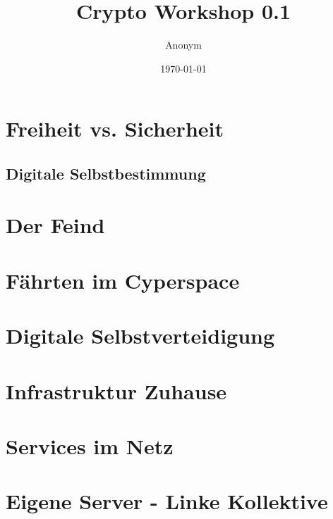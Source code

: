 \documentclass[utf8x]{beamer}
\begin{document}
\title{Crypto Workshop 0.1}   
\author{Anonym} 
\date{\today} 

\frame{\titlepage} 


\section{Freiheit vs. Sicherheit} 
\subsection{Digitale Selbstbestimmung} 

\section{Der Feind} 

\section{Fährten im Cyperspace} 
\section{Digitale Selbstverteidigung} 


\section{Infrastruktur Zuhause} 

\section{Services im Netz} 

\section{Eigene Server - Linke Kollektive} 
\end{document}
